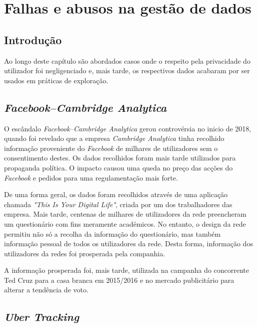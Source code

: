 \chapter{Falhas e abusos na gestão de dados}
\label{chap6:falhas}

\section{Introdução}
\label{chap6:intro}

Ao longo deste capítulo são abordados casos onde o respeito pela privacidade do utilizador foi negligenciado e, mais tarde, os respectivos dados acabaram por ser usados em práticas de exploração.




\section{\textit{Facebook–Cambridge Analytica}}
\label{chap6:exe1}

O escândalo \textit{Facebook–Cambridge Analytica} gerou controvérsia no inicio de 2018, quando foi revelado que a empresa \textit{Cambridge Analytica} tinha recolhido informação proveniente do \textit{Facebook} de milhares de utilizadores sem o consentimento destes. Os dados recolhidos foram mais tarde utilizados para propaganda política. O impacto causou uma queda no preço das acções do \textit{Facebook} e pedidos para uma regulamentação mais forte.

De uma forma geral, os dados foram recolhidos através de uma aplicação chamada \textit{"This Is Your Digital Life"}, criada por um dos trabalhadores das empresa. Mais tarde, centenas de milhares de utilizadores da rede preencheram um questionário com fins meramente académicos. No entanto, o design da rede permitiu não só a recolha da informação do questionário, mas também informação pessoal de todos os utilizadores da rede. Desta forma, informação dos utilizadores da redes foi prosperada pela companhia.

A informação prosperada foi, mais tarde, utilizada na campanha do concorrente Ted Cruz para a casa branca em 2015/2016 e no mercado publicitário para alterar a tendência de voto.




\section{\textit{Uber Tracking}}
\label{chap6:exe2}

